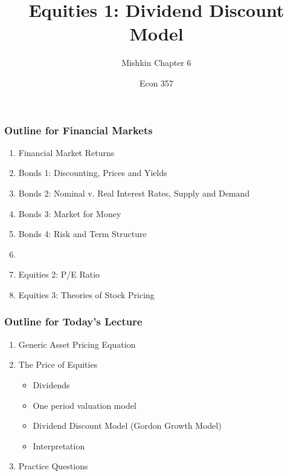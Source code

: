 \documentclass{beamer}
\title{Equities 1: Dividend Discount Model}
\subtitle{Mishkin Chapter 6}
\author{Econ 357}
\date{\week}
\begin{document}
\frame{\titlepage}

\begin{frame}
    \frametitle{Outline for Financial Markets}
        \begin{enumerate}
            \item Financial Market Returns
            \item Bonds 1: Discounting, Prices and Yields
            \item Bonds 2: Nominal v. Real Interest Rates, Supply and Demand
            \item Bonds 3: Market for Money
            \item Bonds 4: Risk and Term Structure
            \item {}
            \item Equities 2: P/E Ratio
            \item Equities 3: Theories of Stock Pricing
            
        \end{enumerate}
\end{frame}


\begin{frame}
    \frametitle{Outline for Today's Lecture}
    \begin{enumerate}
        \item Generic Asset Pricing Equation
        \item The Price of Equities
        \begin{itemize}
            \item Dividends
            \item One period valuation model
            \item Dividend Discount Model (Gordon Growth Model)
            \item Interpretation
        \end{itemize}
        \item Practice Questions
    \end{enumerate}

\end{frame}
\end{document}
